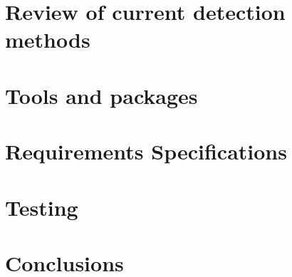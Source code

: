 \documentclass[10pt,twoside]{book}
\begin{document}
%
%
%
%
\tableofcontents

\mainmatter

\part{Review of current detection methods}




\part{Tools and packages}
\part{Requirements Specifications}

\part{Testing}

\part{Conclusions}




%

%
\end{document}
